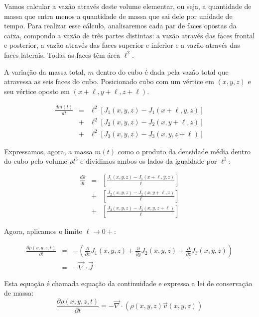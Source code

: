 Vamos calcular a vazão através deste volume elementar, ou seja, a quantidade de massa que entra menos a quantidade de massa que sai dele por unidade de tempo. Para realizar esse cálculo, analisaremos cada par de faces opostas da caixa, compondo a vazão de três partes distintas: a vazão através das faces frontal e posterior, a vazão através das faces superior e inferior e a vazão através das faces laterais. Todas as faces têm área $\ell^2$.

A variação da massa total, $m$ dentro do cubo é dada pela vazão total que atravessa as seis faces do cubo. Posicionado cubo com um vértice em $(x,y,z)$ e seu vértice oposto em $(x+\ell, y+\ell, z+\ell)$.

\begin{eqnarray*}
  \frac{d m(t)}{dt} &=&\ell^2 \left[J_1(x, y, z)-J_1(x+\ell, y, z)\right] \\
  &+& \ell^2 \left[J_2(x, y, z)-J_2(x, y+\ell, z)\right]\\
  &+& \ell^2 \left[J_3(x, y, z)-J_3(x, y, z+\ell)\right]
\end{eqnarray*}
  
Expressamos, agora, a massa $m(t)$ como o produto da densidade média dentro do cubo pelo volume $\bar{\rho} l^3$ e dividimos ambos os lados da igualdade por $\ell^3$:

\begin{eqnarray*}
  \frac{d \bar{\rho}}{d t} &=& \left[\frac{J_1(x, y, z)-J_1(x+\ell, y, z)}{\ell}\right] \\
  &+&  \left[\frac{J_2(x, y, z)-J_2(x, y+\ell, z)}{\ell}\right]\\
  &+&  \left[\frac{J_3(x, y, z)-J_3(x, y, z+\ell)}{\ell}\right]
\end{eqnarray*}

Agora, aplicamos o limite $\ell \to 0+$:

\begin{eqnarray*}
  \frac{\partial \rho(x,y,z,t)}{\partial t} &=& -\left(\frac{\partial}{\partial x}J_1(x, y, z)+\frac{\partial}{\partial y}J_2(x, y, z)+\frac{\partial}{\partial z}J_3(x, y, z)\right)\\
  &=&-\vec{\nabla}\cdot\vec{J}
\end{eqnarray*}

Esta equação é chamada equação da continuidade e expressa a lei de conservação de massa:
$$\frac{\partial \rho(x,y,z,t)}{\partial t}=-\vec{\nabla}\cdot\left(\rho(x,y,z) \vec{v}(x,y,z)\right) $$

